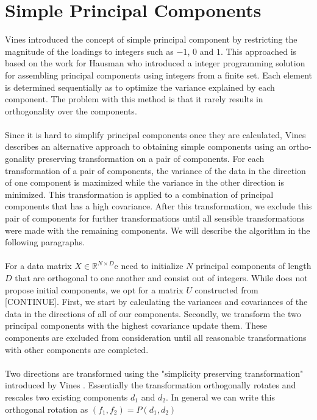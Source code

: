 \documentclass[10pt,letterpaper]{article}
\begin{document}
\section*{Simple Principal Components}
Vines \citeyear{Vines2000} introduced the concept of simple principal component by restricting the magnitude of the loadings to integers such as $-1$, $0$ and $1$. This approached is based on the work for Hausman \citeyear{Hausman1982} who introduced a integer programming solution for assembling principal components using integers from a finite set. Each element is determined sequentially as to optimize the variance explained by each component. The problem with this method is that it rarely results in orthogonality over the components.\\
\\
Since it is hard to simplify principal components once they are calculated, Vines describes an alternative approach to obtaining simple components using an ortho-gonality preserving transformation on a pair of components. For each transformation of a pair of components, the variance of the data in the direction of one component is maximized while the variance in the other direction is minimized. This transformation is applied to a combination of principal components that has a high covariance. After this transformation, we exclude this pair of components for further transformations until all sensible transformations were made with the remaining components. We will describe the algorithm in the following paragraphs.\\
\\
For a data matrix $X\in\mathbb{R}^{N\times D}$e need to initialize $N$ principal components of length $D$ that are orthogonal to one another and consist out of integers. While does not propose initial components, we opt for a matrix $U$ constructed from [CONTINUE]. First, we start by calculating the variances and covariances of the data in the directions of all of our components. Secondly, we transform the two principal components with the highest covariance update them. These components are excluded from consideration until all reasonable transformations with other components are completed.\\
\\
Two directions are transformed using the "simplicity preserving transformation" introduced by Vines \citeyear{Vines2000}. Essentially the transformation orthogonally rotates and rescales two existing components $d_1$ and $d_2$. In general we can write this orthogonal rotation as $(f_1,f_2) = P(d_1,d_2)$ 
\end{document}
